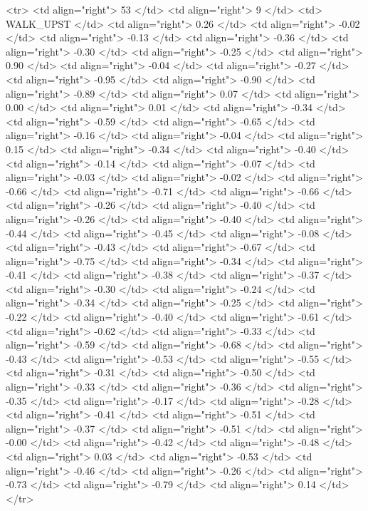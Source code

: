   <tr> <td align="right"> 53 </td> <td align="right">   9 </td> <td> WALK_UPST </td> <td align="right"> 0.26 </td> <td align="right"> -0.02 </td> <td align="right"> -0.13 </td> <td align="right"> -0.36 </td> <td align="right"> -0.30 </td> <td align="right"> -0.25 </td> <td align="right"> 0.90 </td> <td align="right"> -0.04 </td> <td align="right"> -0.27 </td> <td align="right"> -0.95 </td> <td align="right"> -0.90 </td> <td align="right"> -0.89 </td> <td align="right"> 0.07 </td> <td align="right"> 0.00 </td> <td align="right"> 0.01 </td> <td align="right"> -0.34 </td> <td align="right"> -0.59 </td> <td align="right"> -0.65 </td> <td align="right"> -0.16 </td> <td align="right"> -0.04 </td> <td align="right"> 0.15 </td> <td align="right"> -0.34 </td> <td align="right"> -0.40 </td> <td align="right"> -0.14 </td> <td align="right"> -0.07 </td> <td align="right"> -0.03 </td> <td align="right"> -0.02 </td> <td align="right"> -0.66 </td> <td align="right"> -0.71 </td> <td align="right"> -0.66 </td> <td align="right"> -0.26 </td> <td align="right"> -0.40 </td> <td align="right"> -0.26 </td> <td align="right"> -0.40 </td> <td align="right"> -0.44 </td> <td align="right"> -0.45 </td> <td align="right"> -0.08 </td> <td align="right"> -0.43 </td> <td align="right"> -0.67 </td> <td align="right"> -0.75 </td> <td align="right"> -0.34 </td> <td align="right"> -0.41 </td> <td align="right"> -0.38 </td> <td align="right"> -0.37 </td> <td align="right"> -0.30 </td> <td align="right"> -0.24 </td> <td align="right"> -0.34 </td> <td align="right"> -0.25 </td> <td align="right"> -0.22 </td> <td align="right"> -0.40 </td> <td align="right"> -0.61 </td> <td align="right"> -0.62 </td> <td align="right"> -0.33 </td> <td align="right"> -0.59 </td> <td align="right"> -0.68 </td> <td align="right"> -0.43 </td> <td align="right"> -0.53 </td> <td align="right"> -0.55 </td> <td align="right"> -0.31 </td> <td align="right"> -0.50 </td> <td align="right"> -0.33 </td> <td align="right"> -0.36 </td> <td align="right"> -0.35 </td> <td align="right"> -0.17 </td> <td align="right"> -0.28 </td> <td align="right"> -0.41 </td> <td align="right"> -0.51 </td> <td align="right"> -0.37 </td> <td align="right"> -0.51 </td> <td align="right"> -0.00 </td> <td align="right"> -0.42 </td> <td align="right"> -0.48 </td> <td align="right"> 0.03 </td> <td align="right"> -0.53 </td> <td align="right"> -0.46 </td> <td align="right"> -0.26 </td> <td align="right"> -0.73 </td> <td align="right"> -0.79 </td> <td align="right"> 0.14 </td> </tr>
